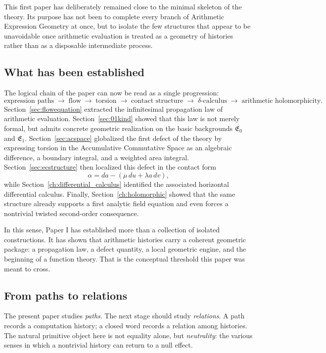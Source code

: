 This first paper has deliberately remained close to the minimal skeleton of the theory. Its purpose has not been to complete every branch of Arithmetic Expression Geometry at once, but to isolate the few structures that appear to be unavoidable once arithmetic evaluation is treated as a geometry of histories rather than as a disposable intermediate process.

\subsection{What has been established}

The logical chain of the paper can now be read as a single progression:
\[
\text{expression paths}
\;\longrightarrow\;
\text{flow}
\;\longrightarrow\;
\text{torsion}
\;\longrightarrow\;
\text{contact structure}
\;\longrightarrow\;
\delta\text{-calculus}
\;\longrightarrow\;
\text{arithmetic holomorphicity}.
\]
Section~\ref{sec:flowequation} extracted the infinitesimal propagation law of arithmetic evaluation. Section~\ref{sec:01kind} showed that this law is not merely formal, but admits concrete geometric realization on the basic backgrounds $\mathfrak{E}_0$ and $\mathfrak{E}_1$. Section~\ref{sec:acspace} globalized the first defect of the theory by expressing torsion in the Accumulative Commutative Space as an algebraic difference, a boundary integral, and a weighted area integral. Section~\ref{sec:ecstructure} then localized this defect in the contact form
\[
\alpha = da-(\mu\,du+\lambda a\,dv),
\]
while Section~\ref{ch:differential_calculus} identified the associated horizontal differential calculus. Finally, Section~\ref{ch:holomorphic} showed that the same structure already supports a first analytic field equation and even forces a nontrivial twisted second-order consequence.

In this sense, Paper I has established more than a collection of isolated constructions. It has shown that arithmetic histories carry a coherent geometric package: a propagation law, a defect quantity, a local geometric engine, and the beginning of a function theory. That is the conceptual threshold this paper was meant to cross.

\subsection{From paths to relations}

The present paper studies \emph{paths}. The next stage should study \emph{relations}. A path records a computation history; a closed word records a relation among histories. The natural primitive object here is not equality alone, but \emph{neutrality}: the various senses in which a nontrivial history can return to a null effect.

